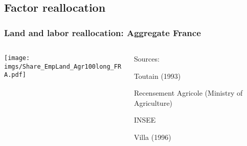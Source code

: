 \documentclass[aspectratio=169]{beamer}
\begin{document}
\subsection{Factor reallocation}

\begin{frame}
\frametitle{Land and labor reallocation: Aggregate France}
\begin{columns}
\begin{column}{0.7\textwidth}
\texttt{[image: \\imgs/Share\_EmpLand\_Agr100long\_FRA.pdf]}
\end{column}
\begin{column}{0.3\textwidth}
Sources:
\begin{mide}
\item Toutain (1993) 
\item Recensement Agricole (Ministry of Agriculture)
\item INSEE
\item Villa (1996)
\end{mide}
\end{column}
\end{columns}
\end{frame}



\end{document}
